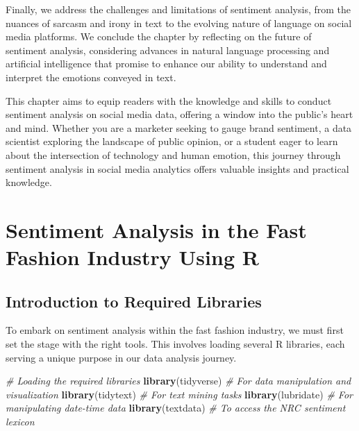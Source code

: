 \documentclass[
]{book}
\newenvironment{Shaded}{\begin{snugshade}}{\end{snugshade}}
\newcommand{\CommentTok}[1]{\textcolor[rgb]{0.56,0.35,0.01}{\textit{#1}}}
\newcommand{\FunctionTok}[1]{\textcolor[rgb]{0.13,0.29,0.53}{\textbf{#1}}}
\newcommand{\NormalTok}[1]{#1}
\begin{document}
Finally, we address the challenges and limitations of sentiment analysis, from the nuances of sarcasm and irony in text to the evolving nature of language on social media platforms. We conclude the chapter by reflecting on the future of sentiment analysis, considering advances in natural language processing and artificial intelligence that promise to enhance our ability to understand and interpret the emotions conveyed in text.

This chapter aims to equip readers with the knowledge and skills to conduct sentiment analysis on social media data, offering a window into the public's heart and mind. Whether you are a marketer seeking to gauge brand sentiment, a data scientist exploring the landscape of public opinion, or a student eager to learn about the intersection of technology and human emotion, this journey through sentiment analysis in social media analytics offers valuable insights and practical knowledge.

\hypertarget{sentiment-analysis-in-the-fast-fashion-industry-using-r}{%
\section{Sentiment Analysis in the Fast Fashion Industry Using R}\label{sentiment-analysis-in-the-fast-fashion-industry-using-r}}

\hypertarget{introduction-to-required-libraries}{%
\subsection{Introduction to Required Libraries}\label{introduction-to-required-libraries}}

To embark on sentiment analysis within the fast fashion industry, we must first set the stage with the right tools. This involves loading several R libraries, each serving a unique purpose in our data analysis journey.

\begin{Shaded}
\begin{Highlighting}[]
\CommentTok{\# Loading the required libraries}
\FunctionTok{library}\NormalTok{(tidyverse)  }\CommentTok{\# For data manipulation and visualization}
\FunctionTok{library}\NormalTok{(tidytext)   }\CommentTok{\# For text mining tasks}
\FunctionTok{library}\NormalTok{(lubridate)  }\CommentTok{\# For manipulating date{-}time data}
\FunctionTok{library}\NormalTok{(textdata)   }\CommentTok{\# To access the NRC sentiment lexicon}
\end{Highlighting}
\end{Shaded}
\end{document}

